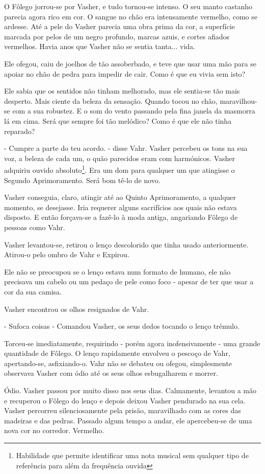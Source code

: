\documentclass[11pt,a4paper]{book}
\begin{document}
O Fôlego jorrou-se por Vasher, e tudo tornou-se intenso. O seu manto castanho parecia agora rico em cor. O sangue no chão era intensamente vermelho, como se ardesse. Até a pele do Vasher parecia uma obra prima da cor, a superfície marcada por pelos de um negro profundo, marcas azuis, e cortes afiados vermelhos. Havia anos que Vasher não se sentia tanta... vida.

Ele ofegou, caiu de joelhos de tão assoberbado, e teve que usar uma mão para se apoiar no chão de pedra para impedir de cair. Como é que eu vivia sem isto?

Ele sabia que os sentidos não tinham melhorado, mas ele sentia-se tão mais desperto. Mais ciente da beleza da sensação. Quando tocou no chão, maravilhou-se com a sua robustez. E o som do vento passando pela fina janela da masmorra lá em cima. Será que sempre foi tão melódico? Como é que ele não tinha reparado?

 - Cumpre a parte do teu acordo. - disse Vahr. Vasher percebeu os tons na sua voz, a beleza de cada um, o quão parecidos eram com harmónicos. Vasher adquiriu ouvido absoluto\footnote{Habilidade que permite identificar uma nota musical sem qualquer tipo de referência para além da frequência ouvida}. Era um dom para qualquer um que atingisse o Segundo Aprimoramento. Será bom tê-lo de novo.

 Vasher conseguia, claro, atingir até ao Quinto Aprimoramento, a qualquer momento, se desejasse. Iria requerer alguns sacrifícios aos quais não estava disposto. E então forçava-se a fazê-lo à moda antiga, angariando Fôlego de pessoas como Vahr.

 Vasher levantou-se, retirou o lenço descolorido que tinha usado anteriormente. Atirou-o pelo ombro de Vahr e Expirou. 
 
 Ele não se preocupou se o lenço estava num formato de humano, ele não precisava um cabelo ou um pedaço de pele como foco - apesar de ter que usar a cor da sua camisa.
 
 Vasher encontrou os olhos resignados de Vahr.
 
 - Sufoca coisas - Comandou Vasher, os seus dedos tocando o lenço trémulo.
 
 Torceu-se imediatamente, requirindo - porém agora inofensivamente - uma grande quantidade de Fôlego. O lenço rapidamente envolveu o pescoço de Vahr, apertando-se, asfixiando-o. Vahr não se debateu ou ofegou, simplesmente observava Vasher com ódio até os seus olhos esbugalharem e morrer.
 
 Ódio. Vasher passou por muito disso nos seus dias. Calmamente, levantou a mão e recuperou o Fôlego do lenço e depois deixou Vasher pendurado na sua cela. Vasher percorreu silenciosamente pela prisão, maravilhado com as cores das madeiras e das pedras. Passado algum tempo a andar, ele apercebeu-se de uma nova cor no corredor. Vermelho.
 
\end{document}
